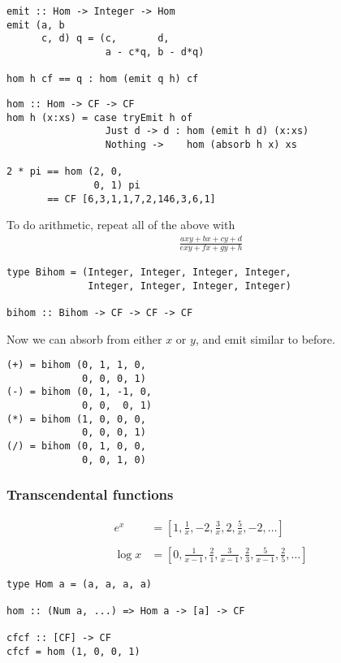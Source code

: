 \documentclass[11pt]{beamer}
\begin{document}
\begin{frame}[fragile]
\begin{verbatim}
emit :: Hom -> Integer -> Hom
emit (a, b
      c, d) q = (c,       d,
                 a - c*q, b - d*q)

hom h cf == q : hom (emit q h) cf
\end{verbatim}
\end{frame}

\begin{frame}[fragile]
\begin{verbatim}
hom :: Hom -> CF -> CF
hom h (x:xs) = case tryEmit h of
                 Just d -> d : hom (emit h d) (x:xs)
                 Nothing ->    hom (absorb h x) xs

2 * pi == hom (2, 0,
               0, 1) pi
       == CF [6,3,1,1,7,2,146,3,6,1]
\end{verbatim}
\end{frame}

\begin{frame}[fragile]
To do arithmetic, repeat all of the above with
\begin{align*}
\frac{axy + bx + cy + d}{exy + fx + gy + h}
\end{align*}
\begin{verbatim}
type Bihom = (Integer, Integer, Integer, Integer,
              Integer, Integer, Integer, Integer)

bihom :: Bihom -> CF -> CF -> CF
\end{verbatim}
Now we can absorb from either $x$ or $y$, and emit similar to before.
\end{frame}

\begin{frame}[fragile]
\begin{verbatim}
(+) = bihom (0, 1, 1, 0,
             0, 0, 0, 1)
(-) = bihom (0, 1, -1, 0,
             0, 0,  0, 1)
(*) = bihom (1, 0, 0, 0,
             0, 0, 0, 1)
(/) = bihom (0, 1, 0, 0,
             0, 0, 1, 0)
\end{verbatim}
\end{frame}

\begin{frame}[fragile]
\frametitle{Transcendental functions}
\begin{align*}
e^x &= [1, \frac{1}{x}, -2, \frac{3}{x}, 2, \frac{5}{x}, -2, \dots] \\
~\\
\log x &= [0, \frac{1}{x-1}, \frac{2}{1}, \frac{3}{x-1}, \frac{2}{3}, \frac{5}{x-1}, \frac{2}{5}, \dots]
\end{align*}
\pause
\begin{verbatim}
type Hom a = (a, a, a, a)

hom :: (Num a, ...) => Hom a -> [a] -> CF

cfcf :: [CF] -> CF
cfcf = hom (1, 0, 0, 1)
\end{verbatim}
\end{frame}
\end{document}
